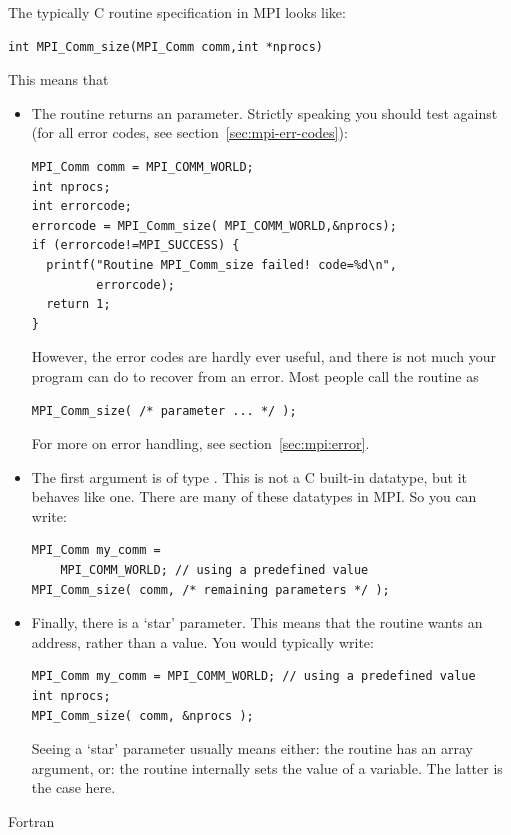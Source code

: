 The typically C routine specification in MPI looks like:
\begin{lstlisting}
int MPI_Comm_size(MPI_Comm comm,int *nprocs)
\end{lstlisting}
This means that
\begin{itemize}
\item The routine returns an  parameter. Strictly speaking you
  should test against  (for all error codes,
  see section~\ref{sec:mpi-err-codes}):
\begin{lstlisting}
MPI_Comm comm = MPI_COMM_WORLD;
int nprocs;
int errorcode;
errorcode = MPI_Comm_size( MPI_COMM_WORLD,&nprocs);
if (errorcode!=MPI_SUCCESS) {
  printf("Routine MPI_Comm_size failed! code=%d\n",
         errorcode);
  return 1;
}
\end{lstlisting}
  However, the error codes are hardly ever useful, and there is not
  much your program can do to recover from an error. Most people call
  the routine as
\begin{lstlisting}
MPI_Comm_size( /* parameter ... */ );
\end{lstlisting}
For more on error handling, see section~\ref{sec:mpi:error}.
\item The first argument is of type . This is not a C
  built-in datatype, but it behaves like one. There are many of these
   datatypes in MPI. So you can write:
\begin{lstlisting}
MPI_Comm my_comm =
    MPI_COMM_WORLD; // using a predefined value
MPI_Comm_size( comm, /* remaining parameters */ );
\end{lstlisting}
\item Finally, there is a `star' parameter. This means that the
  routine wants an address, rather than a value. You would typically write:
\begin{lstlisting}
MPI_Comm my_comm = MPI_COMM_WORLD; // using a predefined value
int nprocs;
MPI_Comm_size( comm, &nprocs );
\end{lstlisting}
  Seeing a `star' parameter usually means either: the routine has an
  array argument, or: the routine internally sets the value of a
  variable. The latter is the case here.
\end{itemize}

 {Fortran}

